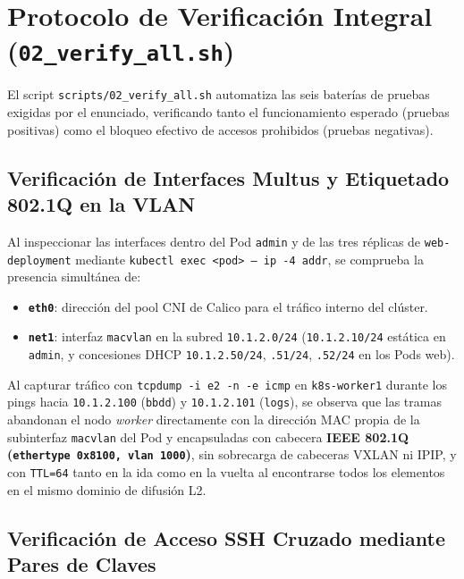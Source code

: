 \section{Protocolo de Verificación Integral (\texttt{02\_verify\_all.sh})}

El script \texttt{scripts/02\_verify\_all.sh} automatiza las seis baterías de pruebas exigidas por el enunciado, verificando tanto el funcionamiento esperado (pruebas positivas) como el bloqueo efectivo de accesos prohibidos (pruebas negativas).

\subsection{Verificación de Interfaces Multus y Etiquetado 802.1Q en la VLAN}

Al inspeccionar las interfaces dentro del Pod \texttt{admin} y de las tres réplicas de \texttt{web-deployment} mediante \texttt{kubectl exec <pod> -- ip -4 addr}, se comprueba la presencia simultánea de:
\begin{itemize}
  \item \textbf{\texttt{eth0}}: dirección del pool CNI de Calico para el tráfico interno del clúster.
  \item \textbf{\texttt{net1}}: interfaz \texttt{macvlan} en la subred \texttt{10.1.2.0/24} (\texttt{10.1.2.10/24} estática en \texttt{admin}, y concesiones DHCP \texttt{10.1.2.50/24}, \texttt{.51/24}, \texttt{.52/24} en los Pods web).
\end{itemize}

Al capturar tráfico con \texttt{tcpdump -i e2 -n -e icmp} en \texttt{k8s-worker1} durante los pings hacia \texttt{10.1.2.100} (\texttt{bbdd}) y \texttt{10.1.2.101} (\texttt{logs}), se observa que las tramas abandonan el nodo \textit{worker} directamente con la dirección MAC propia de la subinterfaz \texttt{macvlan} del Pod y encapsuladas con cabecera \textbf{IEEE 802.1Q (\texttt{ethertype 0x8100, vlan 1000})}, sin sobrecarga de cabeceras VXLAN ni IPIP, y con \texttt{TTL=64} tanto en la ida como en la vuelta al encontrarse todos los elementos en el mismo dominio de difusión L2.

\subsection{Verificación de Acceso SSH Cruzado mediante Pares de Claves}

